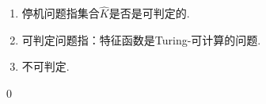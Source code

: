 \begin{pf} \rm \;
    \begin{enumerate}
        \item 停机问题指集合$\hat{K}$是否是可判定的.
        \item 可判定问题指：特征函数是Turing-可计算的问题.
        \item 不可判定.
    \end{enumerate}
    \qed
\end{pf}